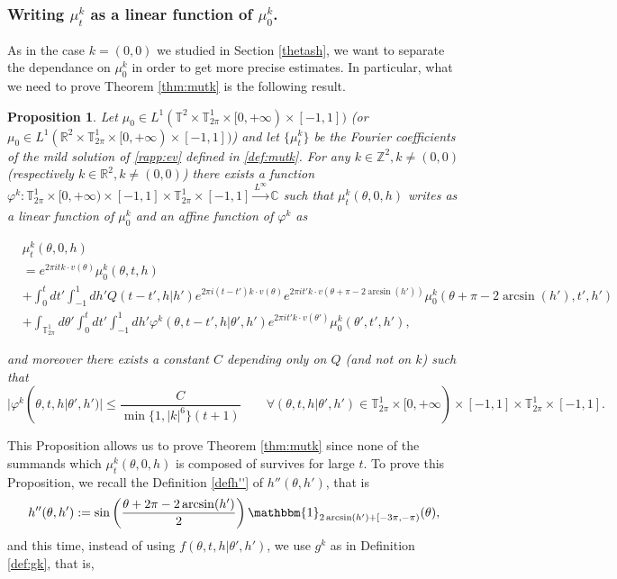 \documentclass[a4paper,10pt,reqno]{amsart}
\newtheorem{proposition}{Proposition}[section]
\numberwithin{equation}{subsection}
\numberwithin{figure}{subsection}
\begin{document}
\subsubsection{Writing $\mu_t^k$ as a linear function of $\mu_0^k$.}
As in the case $k=(0,0)$ we studied in Section \ref{thetash}, we want to separate the dependance on $\mu_0^k$ in order to get more precise estimates. In particular, what we need to prove Theorem \ref{thm:mutk} is the following result.
\begin{proposition}\label{prop:phik}
Let $\mu_0\in L^1(\mathbb{T}^2\times\mathbb{T}^1_{2\pi}\times[0,+\infty)\times[-1,1])$ (or $\mu_0\in L^1(\mathbb{R}^2\times\mathbb{T}^1_{2\pi}\times[0,+\infty)\times[-1,1])$) and let $\{\mu_t^k\}$ be the Fourier coefficients of the mild solution of \eqref{rapp:ev} defined in \eqref{def:mutk}. For any $k\in\mathbb{Z}^2,k\neq(0,0)$ (respectively $k\in\mathbb{R}^2,k\neq(0,0)$) there exists a function $\varphi^k:\mathbb{T}^1_{2\pi}\times[0,+\infty)\times[-1,1]\times\mathbb{T}^1_{2\pi}\times[-1,1]\xrightarrow[]{L^{\infty}}\mathbb{C}$ such that $\mu_t^k(\theta,0,h)$ writes as a linear function of $\mu_0^k$ and an affine function of $\varphi^k$ as

{\scriptsize\begin{align*}
&\mu_t^k(\theta,0,h)
\\
&=e^{2\pi itk\cdot v(\theta)}\mu_0^k(\theta,t,h)
\\
&+\int_0^tdt'\int_{-1}^1dh'Q(t-t',h|h')e^{2\pi i(t-t')k\cdot v(\theta)}e^{2\pi it' k\cdot v(\theta+\pi-2\arcsin(h'))}\mu_0^k(\theta+\pi-2\arcsin(h'),t',h')
\\
&+\int_{\mathbb{T}^1_{2\pi}}d\theta'\int_0^tdt'\int_{-1}^1dh'\varphi^k(\theta,t-t',h|\theta',h')e^{2\pi it' k\cdot v(\theta')}\mu_0^k(\theta',t',h'),
\end{align*}}

and moreover there exists a constant $C$ depending only on $Q$ (and not on $k$) such that
{\footnotesize\[
|\varphi^k(\theta,t,h|\theta',h')|\leq\frac{C}{\min\{1,|k|^6\}(t+1)}\qquad\forall(\theta,t,h|\theta',h')\in\mathbb{T}^1_{2\pi}\times[0,+\infty)\times[-1,1]\times\mathbb{T}^1_{2\pi}\times[-1,1].
\]}
\end{proposition}
This Proposition allows us to prove Theorem \ref{thm:mutk} since none of the summands which $\mu_t^k(\theta,0,h)$ is composed of survives for large $t$. To prove this Proposition, we recall the Definition  \ref{defh''} of  $h''(\theta,h')$, that is
\[
h''(\theta,h'):=\sin\left(\frac{\theta+2\pi-2\arcsin(h')}{2}\right)\mathbbm{1}_{2\arcsin(h')+[-3\pi,-\pi)}(\theta),
\]
and this time, instead of using $f(\theta,t,h|\theta',h')$, we use $g^k$ as in Definition \ref{def:gk}, that is,
\end{document}
